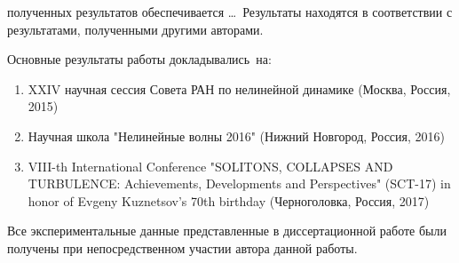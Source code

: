 
{\reliability} полученных результатов обеспечивается \ldots \ Результаты находятся в соответствии с результатами, полученными другими авторами.


{\probation}
Основные результаты работы докладывались~на:
\begin{enumerate}
	\item XXIV научная сессия Совета РАН по нелинейной динамике (Москва, Россия, 2015)
	\item Научная школа "Нелинейные волны 2016" (Нижний Новгород, Россия, 2016)
	\item VIII-th International Conference "SOLITONS, COLLAPSES AND TURBULENCE: Achievements, Developments and Perspectives" (SCT-17) in honor of Evgeny Kuznetsov's 70th birthday (Черноголовка, Россия, 2017)
\end{enumerate}


{\contribution} Все экспериментальные данные представленные в диссертационной работе были получены при непосредственном участии автора данной работы.


